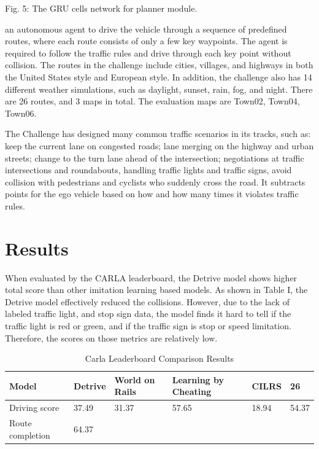 \documentclass[conference]{IEEEtran}
\begin{document}
Fig. 5: The GRU cells network for planner module.

an autonomous agent to drive the vehicle through a sequence of predefined routes, where each route consists of only a few key waypoints. The agent is required to follow the traffic rules and drive through each key point without collision. The routes in the challenge include cities, villages, and highways in both the United States style and European style. In addition, the challenge also has 14 different weather simulations, such as daylight, sunset, rain, fog, and night. There are 26 routes, and 3 maps in total. The evaluation maps are Town02, Town04, Town06.

The Challenge has designed many common traffic scenarios in its tracks, such as: keep the current lane on congested roads; lane merging on the highway and urban streets; change to the turn lane ahead of the intersection; negotiations at traffic intersections and roundabouts, handling traffic lights and traffic signs, avoid collision with pedestrians and cyclists who suddenly cross the road. It subtracts points for the ego vehicle based on how and how many times it violates traffic rules.

\section{Results}

When evaluated by the CARLA leaderboard, the Detrive model shows higher total score than other imitation learning based models. As shown in Table I, the Detrive model effectively reduced the collisions. However, due to the lack of labeled traffic light, and stop sign data, the model finds it hard to tell if the traffic light is red or green, and if the traffic sign is stop or speed limitation. Therefore, the scores on those metrics are relatively low.

\begin{table}
    \centering
    \caption{Carla Leaderboard Comparison Results}
    \label{tab:my-table}
    \begin{tabular}{|l|l|l|l|l|l|}
    \hline
    Model & Detrive & World on Rails & Learning by Cheating & CILRS & 26 \\ \hline
    Driving score & 37.49 & 31.37 & 57.65 & 18.94 & 54.37 \\ \hline
    Route completion & 64.37 & \multicolumn{1}{c|}{} & \multicolumn{1}{c|}{} & \multicolumn{1}{c|}{} & \multicolumn{1}{c|}{} \\ \hline
    \end{tabular}
    \end{table}
    
\end{document}
